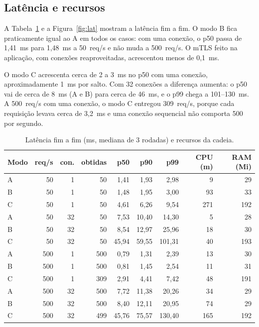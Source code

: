 \documentclass[12pt]{article}
\begin{document}
\subsection{Latência e recursos}

A Tabela~\ref{tab:lat} e a Figura~\ref{fig:lat} mostram a latência fim a fim.
O modo B fica praticamente igual ao A em todos os casos: com uma conexão, o p50
passa de 1,41~ms para 1,48~ms a 50~req/s e não muda a 500~req/s. O mTLS feito
na aplicação, com conexões reaproveitadas, acrescentou menos de 0,1~ms.

O modo C acrescenta cerca de 2 a 3~ms no p50 com uma conexão, aproximadamente
1~ms por salto. Com 32 conexões a diferença aumenta: o p50 vai de cerca de
8~ms (A e B) para cerca de 46~ms, e o p99 chega a 101--130~ms. A 500~req/s com
uma conexão, o modo C entregou 309~req/s, porque cada requisição levava cerca
de 3,2~ms e uma conexão sequencial não comporta 500 por segundo.

\begin{table}[ht]
\centering
\caption{Latência fim a fim (ms, mediana de 3 rodadas) e recursos da cadeia.}
\label{tab:lat}
\small
\begin{tabular}{lrrrrrrrr}
\toprule
Modo & req/s & con. & obtidas & p50 & p90 & p99 & CPU (m) & RAM (Mi) \\
\midrule
A & 50 & 1 & 50 & 1,41 & 1,93 & 2,98 & 9 & 29 \\
B & 50 & 1 & 50 & 1,48 & 1,95 & 3,00 & 93 & 33 \\
C & 50 & 1 & 50 & 4,61 & 6,26 & 9,54 & 271 & 192 \\
\midrule
A & 50 & 32 & 50 & 7,53 & 10,40 & 14,30 & 5 & 28 \\
B & 50 & 32 & 50 & 8,54 & 12,97 & 25,96 & 18 & 30 \\
C & 50 & 32 & 50 & 45,94 & 59,55 & 101,31 & 40 & 193 \\
\midrule
A & 500 & 1 & 500 & 0,79 & 1,31 & 2,39 & 13 & 30 \\
B & 500 & 1 & 500 & 0,81 & 1,45 & 2,54 & 11 & 31 \\
C & 500 & 1 & 309 & 2,91 & 4,41 & 7,42 & 48 & 191 \\
\midrule
A & 500 & 32 & 500 & 7,72 & 11,38 & 20,26 & 34 & 29 \\
B & 500 & 32 & 500 & 8,40 & 12,11 & 20,95 & 74 & 29 \\
C & 500 & 32 & 499 & 45,76 & 75,57 & 130,40 & 165 & 192 \\
\bottomrule
\end{tabular}
\end{table}
\end{document}
